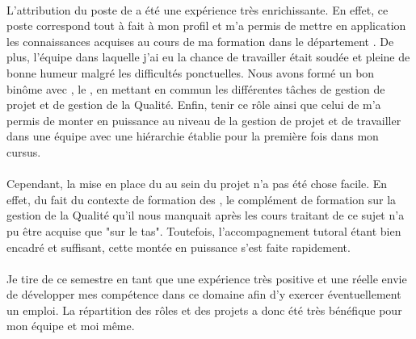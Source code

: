 \documentclass[asi]{picInsa}
\begin{document}
\paragraph*{} L'attribution du poste de \RQ{} a été une expérience très enrichissante. En effet, ce poste correspond tout à fait à mon profil et m'a permis de mettre en application les connaissances acquises au cours de ma formation dans le département \ASI{}. De plus, l'équipe dans laquelle j'ai eu la chance de travailler était soudée et pleine de bonne humeur malgré les difficultés ponctuelles. Nous avons formé un bon binôme avec \Sergi{}, le \CP{}, en mettant en commun les différentes tâches de gestion de projet et de gestion de la Qualité. Enfin, tenir ce rôle ainsi que celui de \CPA{} m'a permis de monter en puissance au niveau de la gestion de projet et de travailler dans une équipe avec une hiérarchie établie pour la première fois dans mon cursus.

\paragraph*{} Cependant, la mise en place du \SMQ{} au sein du projet n'a pas été chose facile. En effet, du fait du contexte de formation des \PIC{}, le complément de formation sur la gestion de la Qualité qu'il nous manquait après les cours traitant de ce sujet n'a pu être acquise que "sur le tas". Toutefois, l'accompagnement tutoral étant bien encadré et suffisant, cette montée en puissance s'est faite rapidement.

\paragraph*{} Je tire de ce semestre en tant que \RQ{} une expérience très positive et une réelle envie de développer mes compétence dans ce domaine afin d'y exercer éventuellement un emploi. La répartition des rôles et des projets a donc été très bénéfique pour mon équipe et moi même.

\pageQuatriemeCouverture
\end{document}
